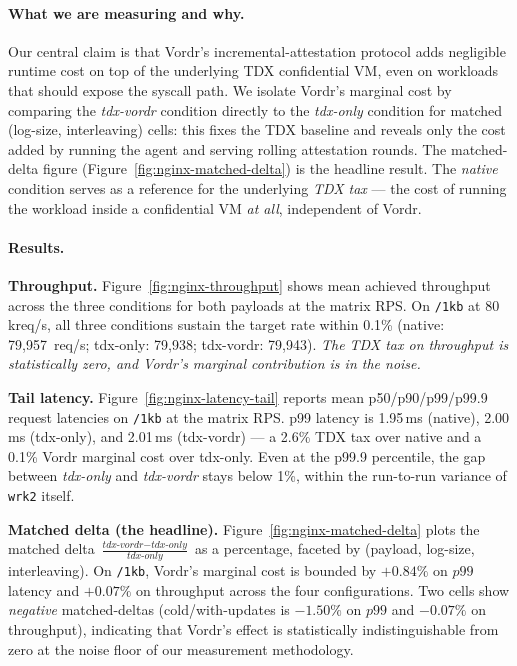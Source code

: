 \paragraph{What we are measuring and why.}
Our central claim is that Vordr's incremental-attestation protocol
adds negligible runtime cost on top of the underlying TDX confidential
VM, even on workloads that should expose the syscall path. We isolate
Vordr's marginal cost by comparing the \emph{tdx-vordr} condition
directly to the \emph{tdx-only} condition for matched
(log-size, interleaving) cells: this fixes the TDX baseline and
reveals only the cost added by running the agent and serving rolling
attestation rounds. The matched-delta figure
(Figure~\ref{fig:nginx-matched-delta}) is the headline result.
The \emph{native} condition serves as a reference for the underlying
\emph{TDX tax} — the cost of running the workload inside a
confidential VM \emph{at all}, independent of Vordr.

\paragraph{Results.}

\textbf{Throughput.} Figure~\ref{fig:nginx-throughput} shows mean
achieved throughput across the three conditions for both payloads at
the matrix RPS. On \texttt{/1kb} at 80\,kreq/s, all three conditions
sustain the target rate within 0.1\%
(native: 79{,}957~req/s; tdx-only: 79{,}938; tdx-vordr: 79{,}943).
\emph{The TDX tax on throughput is statistically zero, and Vordr's
marginal contribution is in the noise.}

\textbf{Tail latency.} Figure~\ref{fig:nginx-latency-tail} reports
mean p50/p90/p99/p99.9 request latencies on \texttt{/1kb} at the
matrix RPS. p99 latency is 1.95\,ms (native), 2.00\,ms (tdx-only),
and 2.01\,ms (tdx-vordr) — a 2.6\% TDX tax over native and a 0.1\%
Vordr marginal cost over tdx-only. Even at the p99.9 percentile, the
gap between \emph{tdx-only} and \emph{tdx-vordr} stays below 1\%,
within the run-to-run variance of \texttt{wrk2} itself.

\textbf{Matched delta (the headline).} Figure~\ref{fig:nginx-matched-delta}
plots the matched delta
$\frac{\textit{tdx-vordr} - \textit{tdx-only}}{\textit{tdx-only}}$
as a percentage, faceted by (payload, log-size, interleaving). On
\texttt{/1kb}, Vordr's marginal cost is bounded by $+0.84\%$ on $p99$
latency and $+0.07\%$ on throughput across the four configurations.
Two cells show \emph{negative} matched-deltas (cold/with-updates is
$-1.50\%$ on $p99$ and $-0.07\%$ on throughput), indicating that
Vordr's effect is statistically indistinguishable from zero at the
noise floor of our measurement methodology.

